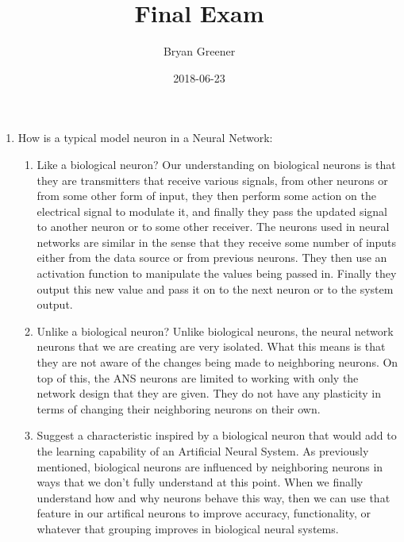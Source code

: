 \documentclass{report}
\title{Final Exam}
\author{Bryan Greener}
\date{2018-06-23}
\theoremstyle{plain} %
\theoremstyle{definition} %
\theoremstyle{plain} %
\begin{document}
\maketitle
\begin{enumerate}
\item How is a typical model neuron in a Neural Network:
	\begin{enumerate}
	\item Like a biological neuron?
		Our understanding on biological neurons is that they are transmitters that receive various signals, from other neurons or from some other form of input, they then perform some action on the electrical signal to modulate it, and finally they pass the updated signal to another neuron or to some other receiver. The neurons used in neural networks are similar in the sense that they receive some number of inputs either from the data source or from previous neurons. They then use an activation function to manipulate the values being passed in. Finally they output this new value and pass it on to the next neuron or to the system output.
	\item Unlike a biological neuron?
		Unlike biological neurons, the neural network neurons that we are creating are very isolated. What this means is that they are not aware of the changes being made to neighboring neurons. On top of this, the ANS neurons are limited to working with only the network design that they are given. They do not have any plasticity in terms of changing their neighboring neurons on their own.
	\item Suggest a characteristic inspired by a biological neuron that would add to the learning capability of an Artificial Neural System.
		As previously mentioned, biological neurons are influenced by neighboring neurons in ways that we don't fully understand at this point. When we finally understand how and why neurons behave this way, then we can use that feature in our artifical neurons to improve accuracy, functionality, or whatever that grouping improves in biological neural systems.
	\end{enumerate}


\end{enumerate}
\end{document}
